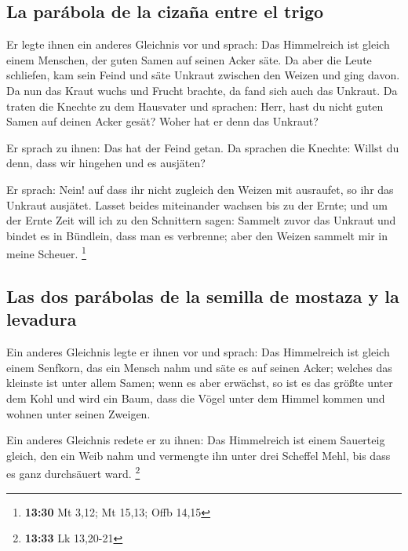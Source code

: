 \hypertarget{la-paruxe1bola-de-la-cizauxf1a-entre-el-trigo}{%
\subsection{La parábola de la cizaña entre el
trigo}\label{la-paruxe1bola-de-la-cizauxf1a-entre-el-trigo}}

 Er legte ihnen ein anderes Gleichnis vor und sprach: Das
Himmelreich ist gleich einem Menschen, der guten Samen auf seinen Acker
säte.  Da aber die Leute schliefen, kam sein Feind und
säte Unkraut zwischen den Weizen und ging davon.  Da nun
das Kraut wuchs und Frucht brachte, da fand sich auch das Unkraut.
 Da traten die Knechte zu dem Hausvater und sprachen:
Herr, hast du nicht guten Samen auf deinen Acker gesät? Woher hat er
denn das Unkraut?

 Er sprach zu ihnen: Das hat der Feind getan. Da sprachen
die Knechte: Willst du denn, dass wir hingehen und es ausjäten?

 Er sprach: Nein! auf dass ihr nicht zugleich den Weizen
mit ausraufet, so ihr das Unkraut ausjätet.  Lasset
beides miteinander wachsen bis zu der Ernte; und um der Ernte Zeit will
ich zu den Schnittern sagen: Sammelt zuvor das Unkraut und bindet es in
Bündlein, dass man es verbrenne; aber den Weizen sammelt mir in meine
Scheuer. \footnote{\textbf{13:30} Mt 3,12; Mt 15,13; Offb 14,15}

\hypertarget{las-dos-paruxe1bolas-de-la-semilla-de-mostaza-y-la-levadura}{%
\subsection{Las dos parábolas de la semilla de mostaza y la
levadura}\label{las-dos-paruxe1bolas-de-la-semilla-de-mostaza-y-la-levadura}}

 Ein anderes Gleichnis legte er ihnen vor und sprach: Das
Himmelreich ist gleich einem Senfkorn, das ein Mensch nahm und säte es
auf seinen Acker;  welches das kleinste ist unter allem
Samen; wenn es aber erwächst, so ist es das größte unter dem Kohl und
wird ein Baum, dass die Vögel unter dem Himmel kommen und wohnen unter
seinen Zweigen.

 Ein anderes Gleichnis redete er zu ihnen: Das
Himmelreich ist einem Sauerteig gleich, den ein Weib nahm und vermengte
ihn unter drei Scheffel Mehl, bis dass es ganz durchsäuert ward.
\footnote{\textbf{13:33} Lk 13,20-21}

